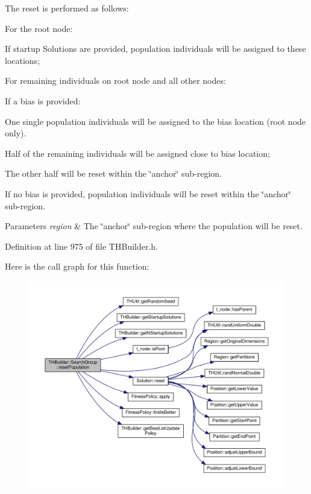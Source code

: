 The reset is performed as follows\+:
\begin{DoxyItemize}
\item For the root node\+:
\begin{DoxyItemize}
\item If startup Solutions are provided, population individuals will be assigned to these locations;
\end{DoxyItemize}
\item For remaining individuals on root node and all other nodes\+:
\begin{DoxyItemize}
\item If a bias is provided\+:
\begin{DoxyItemize}
\item One single population individuals will be assigned to the bias location (root node only).
\item Half of the remaining individuals will be assigned close to bias location;
\item The other half will be reset within the \char`\"{}anchor\char`\"{} sub-\/region.
\end{DoxyItemize}
\item If no bias is provided, population individuals will be reset within the \char`\"{}anchor\char`\"{} sub-\/region.
\end{DoxyItemize}
\end{DoxyItemize}


\begin{DoxyParams}{Parameters}
{\em region} & The \char`\"{}anchor\char`\"{} sub-\/region where the population will be reset. \\
\hline
\end{DoxyParams}


Definition at line 975 of file T\+H\+Builder.\+h.



Here is the call graph for this function\+:\nopagebreak
\begin{figure}[H]
\begin{center}
\leavevmode
\includegraphics[width=350pt]{classTHBuilder_1_1SearchGroup_aafebb836a1ec681213319a024a254ca8_cgraph}
\end{center}
\end{figure}




